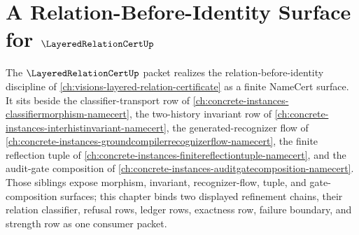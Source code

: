 \chapter{A Relation-Before-Identity Surface for $\LayeredRelationCertUp$}
\label{ch:concrete-instances-layeredrelationcert-namecert}

The $\LayeredRelationCertUp$ packet realizes the relation-before-identity discipline of \autoref{ch:visions-layered-relation-certificate} as a finite NameCert surface. It sits beside the classifier-transport row of \autoref{ch:concrete-instances-classifiermorphism-namecert}, the two-history invariant row of \autoref{ch:concrete-instances-interhistinvariant-namecert}, the generated-recognizer flow of \autoref{ch:concrete-instances-groundcompilerrecognizerflow-namecert}, the finite reflection tuple of \autoref{ch:concrete-instances-finitereflectiontuple-namecert}, and the audit-gate composition of \autoref{ch:concrete-instances-auditgatecomposition-namecert}. Those siblings expose morphism, invariant, recognizer-flow, tuple, and gate-composition surfaces; this chapter binds two displayed refinement chains, their relation classifier, refusal rows, ledger rows, exactness row, failure boundary, and strength row as one consumer packet.



